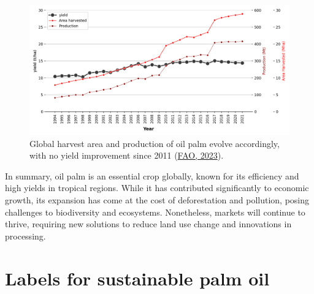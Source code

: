 \documentclass[
  letterpaper,
  DIV=11,
  numbers=noendperiod]{scrreprt}
\begin{document}
\begin{figure}

{\centering \includegraphics{text/04_literature_review_files/op_yield.png}

}

\caption{\label{fig-op_yield}Global harvest area and production of oil
palm evolve accordingly, with no yield improvement since 2011
(\protect\hyperlink{ref-faoFAOSTATDatabase2023}{FAO, 2023}).}

\end{figure}

In summary, oil palm is an essential crop globally, known for its
efficiency and high yields in tropical regions. While it has contributed
significantly to economic growth, its expansion has come at the cost of
deforestation and pollution, posing challenges to biodiversity and
ecosystems. Nonetheless, markets will continue to thrive, requiring new
solutions to reduce land use change and innovations in processing.

\newpage

\hypertarget{sec-rspo}{%
\section{Labels for sustainable palm oil}\label{sec-rspo}}
\end{document}
